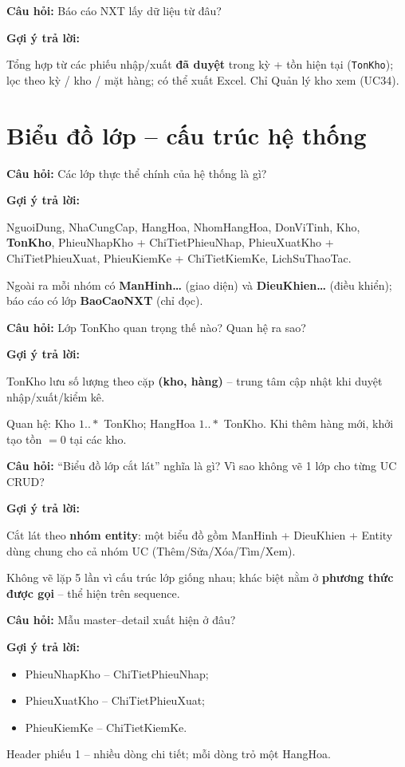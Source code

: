 \documentclass[12pt,a4paper]{article}
\newcommand{\cau}[1]{\textbf{\textcolor{qblue}{Câu hỏi:}} #1}
\newcommand{\traloi}{\par\smallskip\textbf{\textcolor{qblue!70!black}{Gợi ý trả lời:}}\par}
\begin{document}
\begin{cauhoi}[Câu 22]
\cau{Báo cáo NXT lấy dữ liệu từ đâu?}
\traloi
Tổng hợp từ các phiếu nhập/xuất \textbf{đã duyệt} trong kỳ + tồn hiện tại (\texttt{TonKho}); lọc theo kỳ / kho / mặt hàng; có thể xuất Excel. Chỉ Quản lý kho xem (UC34).
\end{cauhoi}

\section{Biểu đồ lớp -- cấu trúc hệ thống}

\begin{cauhoi}
\cau{Các lớp thực thể chính của hệ thống là gì?}
\traloi
NguoiDung, NhaCungCap, HangHoa, NhomHangHoa, DonViTinh, Kho, \textbf{TonKho}, PhieuNhapKho + ChiTietPhieuNhap, PhieuXuatKho + ChiTietPhieuXuat, PhieuKiemKe + ChiTietKiemKe, LichSuThaoTac.

Ngoài ra mỗi nhóm có \textbf{ManHinh\ldots} (giao diện) và \textbf{DieuKhien\ldots} (điều khiển); báo cáo có lớp \textbf{BaoCaoNXT} (chỉ đọc).
\end{cauhoi}

\begin{cauhoi}[Câu 24]
\cau{Lớp TonKho quan trọng thế nào? Quan hệ ra sao?}
\traloi
TonKho lưu số lượng theo cặp \textbf{(kho, hàng)} -- trung tâm cập nhật khi duyệt nhập/xuất/kiểm kê.

Quan hệ: Kho $1..*$ TonKho; HangHoa $1..*$ TonKho. Khi thêm hàng mới, khởi tạo tồn $= 0$ tại các kho.
\end{cauhoi}

\begin{cauhoi}[Câu 25]
\cau{``Biểu đồ lớp cắt lát'' nghĩa là gì? Vì sao không vẽ 1 lớp cho từng UC CRUD?}
\traloi
Cắt lát theo \textbf{nhóm entity}: một biểu đồ gồm ManHinh + DieuKhien + Entity dùng chung cho cả nhóm UC (Thêm/Sửa/Xóa/Tìm/Xem).

Không vẽ lặp 5 lần vì cấu trúc lớp giống nhau; khác biệt nằm ở \textbf{phương thức được gọi} -- thể hiện trên sequence.
\end{cauhoi}

\begin{cauhoi}[Câu 26]
\cau{Mẫu master--detail xuất hiện ở đâu?}
\traloi
\begin{itemize}[leftmargin=1.4em,itemsep=2pt]
  \item PhieuNhapKho -- ChiTietPhieuNhap;
  \item PhieuXuatKho -- ChiTietPhieuXuat;
  \item PhieuKiemKe -- ChiTietKiemKe.
\end{itemize}
Header phiếu 1 -- nhiều dòng chi tiết; mỗi dòng trỏ một HangHoa.
\end{cauhoi}
\end{document}
